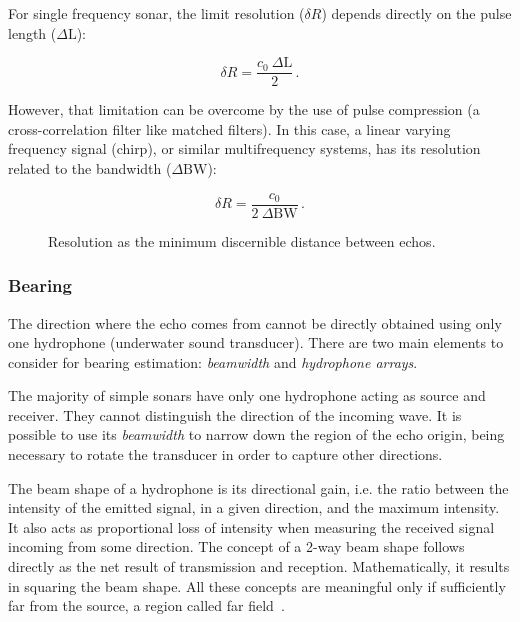 For single frequency sonar, the limit resolution ($\delta R$) depends directly
on the pulse length ($\Delta\text{L}$):

\[ \delta R = \frac{c_0~\Delta\text{L}}{2}\,. \] 

However, that limitation can be overcome by the use of pulse compression (a
cross-correlation filter like matched filters). In this case, a linear varying
frequency signal (chirp), or similar multifrequency systems, has its resolution
related to the bandwidth ($\Delta \text{BW}$):

\[ \delta R = \frac{c_0}{2~\Delta \text{BW}}\,. \]

\begin{figure}
	\centering
	
	\caption{Resolution as the minimum discernible distance between echos.}
	\label{fig:chirpresolution}
\end{figure}


\subsubsection{Bearing}
\label{sss:bearing}

The direction where the echo comes from cannot be directly obtained using
only one hydrophone (underwater sound transducer). There are two main elements
to consider for bearing estimation: \textit{beamwidth} and \textit{hydrophone
arrays}.

The majority of simple sonars have only one hydrophone acting as source and
receiver. They cannot distinguish the direction of the incoming wave. It is
possible to use its \textit{beamwidth} to narrow down the region of the echo
origin, being necessary to rotate the transducer in order to capture
other directions.

The beam shape of a hydrophone is its directional gain, i.e. the ratio between
the intensity of the emitted signal, in a given direction, and the maximum
intensity. It also acts as proportional loss of intensity when measuring the
received signal incoming from some direction. The concept of a 2-way beam
shape follows directly as the net result of transmission and reception.
Mathematically, it results in squaring the beam shape. All these concepts are
meaningful only if sufficiently far from the source, a region called
far field~\cite{beamwidth}.

